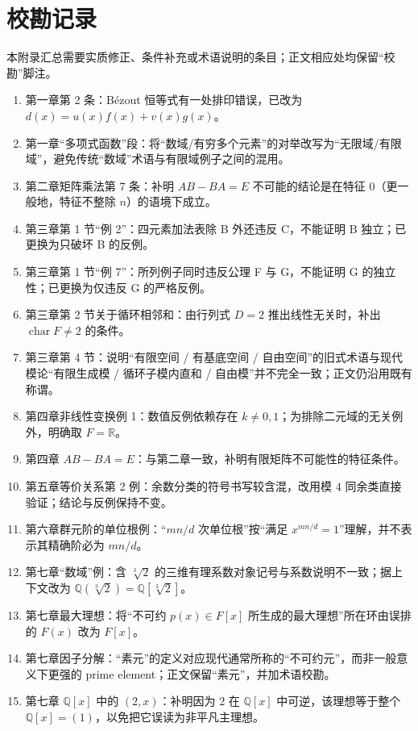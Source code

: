 \documentclass[UTF8,openany,11pt]{ctexbook}
\begin{document}
\chapter{校勘记录}
本附录汇总需要实质修正、条件补充或术语说明的条目；正文相应处均保留“校勘”脚注。
\begin{enumerate}
  \item 第一章第 2 条：Bézout 恒等式有一处排印错误，已改为 $d(x)=u(x)f(x)+v(x)g(x)$。
  \item 第一章“多项式函数”段：将“数域/有穷多个元素”的对举改写为“无限域/有限域”，避免传统“数域”术语与有限域例子之间的混用。
  \item 第二章矩阵乘法第 7 条：补明 $AB-BA=E$ 不可能的结论是在特征 $0$（更一般地，特征不整除 $n$）的语境下成立。
  \item 第三章第 1 节“例 2”：四元素加法表除 B 外还违反 C，不能证明 B 独立；已更换为只破坏 B 的反例。
  \item 第三章第 1 节“例 7”：所列例子同时违反公理 F 与 G，不能证明 G 的独立性；已更换为仅违反 G 的严格反例。
  \item 第三章第 2 节关于循环相邻和：由行列式 $D=2$ 推出线性无关时，补出 $\operatorname{char}F\ne2$ 的条件。
  \item 第三章第 4 节：说明“有限空间 / 有基底空间 / 自由空间”的旧式术语与现代模论“有限生成模 / 循环子模内直和 / 自由模”并不完全一致；正文仍沿用既有称谓。
  \item 第四章非线性变换例 1：数值反例依赖存在 $k\ne0,1$；为排除二元域的无关例外，明确取 $F=\mathbb R$。
  \item 第四章 $AB-BA=E$：与第二章一致，补明有限矩阵不可能性的特征条件。
  \item 第五章等价关系第 2 例：余数分类的符号书写较含混，改用模 $4$ 同余类直接验证；结论与反例保持不变。
  \item 第六章群元阶的单位根例：“$mn/d$ 次单位根”按“满足 $x^{mn/d}=1$”理解，并不表示其精确阶必为 $mn/d$。
  \item 第七章“数域”例：含 $\sqrt[3]2$ 的三维有理系数对象记号与系数说明不一致；据上下文改为 $\mathbb Q(\sqrt[3]2)=\mathbb Q[\sqrt[3]2]$。
  \item 第七章最大理想：将“不可约 $p(x)\in F[x]$ 所生成的最大理想”所在环由误排的 $F(x)$ 改为 $F[x]$。
  \item 第七章因子分解：“素元”的定义对应现代通常所称的“不可约元”，而非一般意义下更强的 prime element；正文保留“素元”，并加术语校勘。
  \item 第七章 $\mathbb Q[x]$ 中的 $(2,x)$：补明因为 $2$ 在 $\mathbb Q[x]$ 中可逆，该理想等于整个 $\mathbb Q[x]=(1)$，以免把它误读为非平凡主理想。
\end{enumerate}

\backmatter
\end{document}
